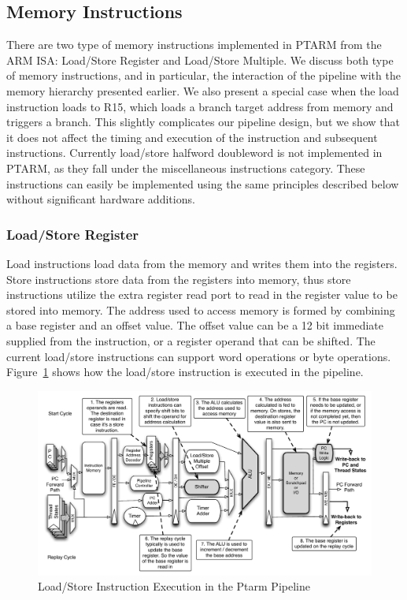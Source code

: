 \subsection{Memory Instructions}
There are two type of memory instructions implemented in PTARM from the ARM ISA: Load/Store Register and Load/Store Multiple.
We discuss both type of memory instructions, and in particular, the interaction of the pipeline with the memory hierarchy presented earlier. 
We also present a special case when the load instruction loads to R15, which loads a branch target address from memory and triggers a branch.  
This slightly complicates our pipeline design, but we show that it does not affect the timing and execution of the instruction and subsequent instructions.
Currently load/store halfword doubleword is not implemented in PTARM, as they fall under the miscellaneous instructions category. 
These instructions can easily be implemented using the same principles described below without significant hardware additions.       
  
\subsubsection{Load/Store Register}
\label{sec:ptarm_instruction_ldstr}

Load instructions load data from the memory and writes them into the registers.
Store instructions store data from the registers into memory, thus store instructions utilize the extra register read port to read in the register value to be stored into memory.
The address used to access memory is formed by combining a base register and an offset value.
The offset value can be a 12 bit immediate supplied from the instruction, or a register operand that can be shifted.
The current load/store instructions can support word operations or byte operations.
Figure~\ref{fig:ldstr_pipeline_implementation} shows how the load/store instruction is executed in the pipeline.

\begin{figure}
  \vspace{-20pt}
  \begin{center}
    \includegraphics[scale=.54]{figs/ldstr_pipeline_implementation}
  \end{center}
  \vspace{-20pt}
  \caption{Load/Store Instruction Execution in the Ptarm Pipeline}
  \label{fig:ldstr_pipeline_implementation}
\end{figure}

